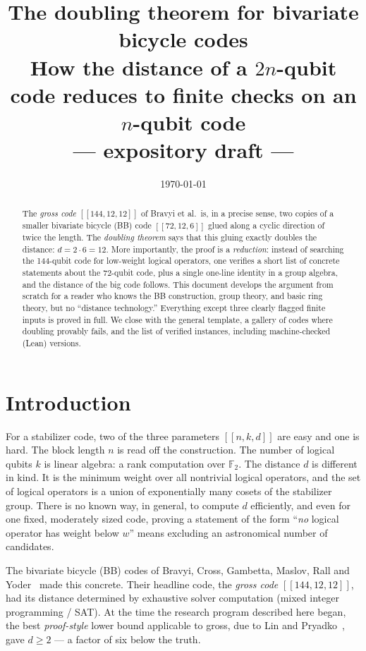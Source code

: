 \documentclass[11pt]{article}
\title{\bfseries The doubling theorem for bivariate bicycle codes\\[4pt]
\large How the distance of a $2n$-qubit code reduces to finite checks on an
$n$-qubit code\\[6pt]
\normalsize\normalfont --- expository draft ---}
\author{}
\date{\today}
\theoremstyle{plain}
\theoremstyle{definition}
\theoremstyle{remark}
\newcommand{\F}{\mathbb{F}}
\begin{document}
\maketitle

\begin{abstract}
\noindent
The \emph{gross code} $[[144,12,12]]$ of Bravyi et al.\ is, in a precise sense,
two copies of a smaller bivariate bicycle (BB) code $[[72,12,6]]$ glued along a
cyclic direction of twice the length. The \emph{doubling theorem} says that this
gluing exactly doubles the distance: $d = 2\cdot 6 = 12$. More importantly, the
proof is a \emph{reduction}: instead of searching the 144-qubit code for
low-weight logical operators, one verifies a short list of concrete statements
about the 72-qubit code, plus a single one-line identity in a group algebra, and
the distance of the big code follows. This document develops the argument from
scratch for a reader who knows the BB construction, group theory, and basic ring
theory, but no ``distance technology.'' Everything except three clearly flagged
finite inputs is proved in full. We close with the general template, a gallery of
codes where doubling provably fails, and the list of verified instances,
including machine-checked (Lean) versions.
\end{abstract}

\tableofcontents

\section{Introduction}

For a stabilizer code, two of the three parameters $[[n,k,d]]$ are easy and one
is hard. The block length $n$ is read off the construction. The number of
logical qubits $k$ is linear algebra: a rank computation over $\F_2$. The
distance $d$ is different in kind. It is the minimum weight over all nontrivial
logical operators, and the set of logical operators is a union of exponentially
many cosets of the stabilizer group. There is no known way, in general, to
compute $d$ efficiently, and even for one fixed, moderately sized code, proving
a statement of the form ``\emph{no} logical operator has weight below $w$''
means excluding an astronomical number of candidates.

The bivariate bicycle (BB) codes of Bravyi, Cross, Gambetta, Maslov, Rall and
Yoder~\cite{bcgmry} made this concrete. Their headline code, the
\emph{gross code} $[[144,12,12]]$, had its distance determined by exhaustive
solver computation (mixed integer programming / SAT). At the time the research
program described here began, the best \emph{proof-style} lower bound applicable
to gross, due to Lin and Pryadko~\cite{linpryadko}, gave $d \geq 2$ --- a
factor of six below the truth.
\end{document}

